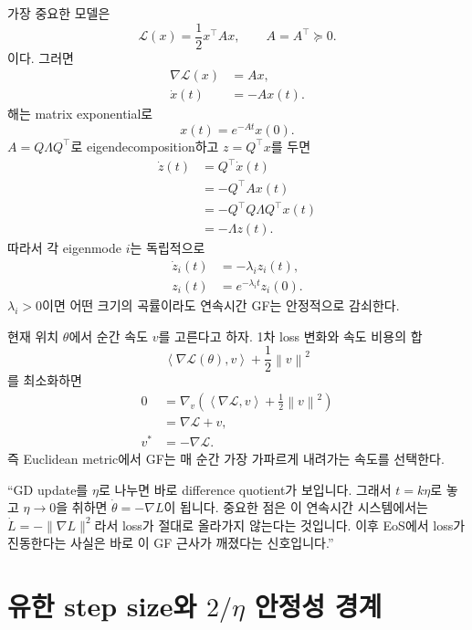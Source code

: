 \documentclass[11pt,a4paper,oneside,openany]{memoir}
\newcommand{\Loss}{\mathcal{L}}
\newcommand{\grad}{\nabla}
\newcommand{\inner}[2]{\left\langle #1,#2\right\rangle}
\newcommand{\norm}[1]{\left\lVert #1\right\rVert}
\theoremstyle{definition}
\begin{document}
가장 중요한 모델은
\begin{equation}
  \Loss(x)=\frac12 x^\top A x,
  \qquad A=A^\top\succeq0.
\end{equation}
이다. 그러면
\begin{align}
  \grad\Loss(x)&=Ax,\\
  \dot x(t)&=-Ax(t).
\end{align}
해는 matrix exponential로
\begin{equation}
  x(t)=e^{-At}x(0).
\end{equation}
$A=Q\Lambda Q^\top$로 eigendecomposition하고 $z=Q^\top x$를 두면
\begin{align}
  \dot z(t)
  &=Q^\top\dot x(t)\\
  &=-Q^\top A x(t)\\
  &=-Q^\top Q\Lambda Q^\top x(t)\\
  &=-\Lambda z(t).
\end{align}
따라서 각 eigenmode $i$는 독립적으로
\begin{align}
  \dot z_i(t)&=-\lambda_i z_i(t),\\
  z_i(t)&=e^{-\lambda_i t}z_i(0).
\end{align}
$\lambda_i>0$이면 어떤 크기의 곡률이라도 연속시간 GF는 안정적으로 감쇠한다.

\begin{suppbox}
현재 위치 $\theta$에서 순간 속도 $v$를 고른다고 하자. 1차 loss 변화와 속도 비용의 합
\[
  \inner{\grad\Loss(\theta)}{v}+\frac12\norm v^2
\]
를 최소화하면
\begin{align}
  0&=\grad_v\left(\inner{\grad\Loss}{v}+\frac12\norm v^2\right)\\
   &=\grad\Loss+v,\\
  v^*&=-\grad\Loss.
\end{align}
즉 Euclidean metric에서 GF는 매 순간 가장 가파르게 내려가는 속도를 선택한다.
\end{suppbox}

\begin{presentbox}
``GD update를 $\eta$로 나누면 바로 difference quotient가 보입니다. 그래서 $t=k\eta$로 놓고
$\eta\to0$을 취하면 $\dot\theta=-\nabla L$이 됩니다. 중요한 점은 이 연속시간 시스템에서는
$\dot L=-\|\nabla L\|^2$라서 loss가 절대로 올라가지 않는다는 것입니다. 이후 EoS에서 loss가 진동한다는 사실은
바로 이 GF 근사가 깨졌다는 신호입니다.''
\end{presentbox}

\chapter{유한 step size와 \texorpdfstring{$2/\eta$}{2/eta} 안정성 경계}
\end{document}
